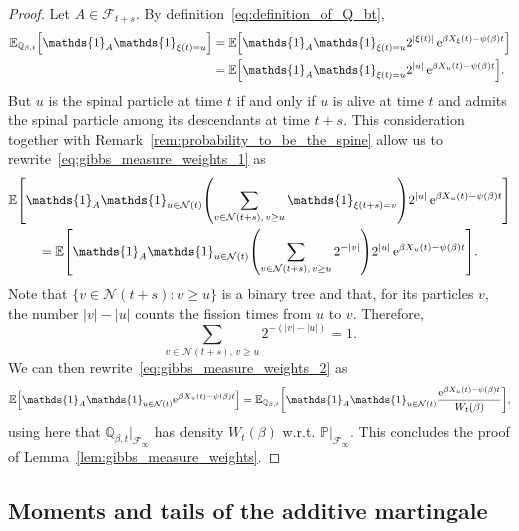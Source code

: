 \documentclass[AHL,Unicode,longabstracts,published]{cedram}
\newcommand{\e}{\mathrm{e}}
\newcommand{\E}{\mathbb{E}}
\renewcommand{\P}{\mathbb{P}}
\newcommand{\Q}{\mathbb{Q}}
\newcommand\1{\mathds{1}}
\newcommand{\cF}{\mathcal{F}}
\newcommand{\cN}{\mathcal{N}}
\let\originalleft\left
\let\originalright\right
\renewcommand{\left}{\mathopen{}\mathclose\bgroup\originalleft}
\renewcommand{\right}{\aftergroup\egroup\originalright}
\begin{document}
\begin{proof}
Let $A \in \cF_{t+s}$. By definition~\eqref{eq:definition_of_Q_bt},
\begin{equation}\label{eq:gibbs_measure_weights_1}
\begin{aligned}
\E_{\Q_{\beta, t}} \left[\1_A \1_{\xi(t) = u} \right] & = \E \left[\1_A \1_{\xi(t) = u} 2^{|\xi(t)|}\, \e^{\beta X_\xi(t) - \psi(\beta) t} \right] \\
& = \E \left[\1_A \1_{\xi(t) = u} 2^{|u|}\, \e^{\beta X_u(t) - \psi(\beta) t} \right]. 
\end{aligned}
\end{equation}
But $u$ is the spinal particle at time $t$ if and only if $u$ is alive at time $t$ and admits the spinal particle among its descendants at time $t + s$. This consideration together with Remark~\ref{rem:probability_to_be_the_spine} allow us to rewrite~\eqref{eq:gibbs_measure_weights_1} as
\begin{multline}\label{eq:gibbs_measure_weights_2}
\E \left[\1_A \1_{u \in \cN(t)} \left(\sum_{v \in \cN(t+s),\, v \geq u} \1_{\xi(t+s) = v}\right) 2^{|u|}\, \e^{\beta X_u(t) - \psi(\beta) t} \right] \\
 = \E \left[\1_A \1_{u \in \cN(t)} \left(\sum_{v \in \cN(t+s),\, v \geq u} 2^{-|v|} \right) 2^{|u|}\, \e^{\beta X_u(t) - \psi(\beta) t} \right].
\end{multline}
Note that $\{v \in \cN(t+s) : v \geq u\}$ is a binary tree and that, for its particles $v$, the number $|v| - |u|$ counts the fission times from $u$ to $v$. Therefore,
\begin{equation*}
\sum_{v \in \cN(t+s),\, v \geq u} 2^{-(|v| - |u|)} = 1.
\end{equation*}
We can then rewrite~\eqref{eq:gibbs_measure_weights_2} as
\begin{equation*}
\E \left[\1_A \1_{u \in \cN(t)} \e^{\beta X_u(t) - \psi(\beta) t} \right] = \E_{\Q_{\beta, t}} \left[\1_A \1_{u \in \cN(t)} \frac{\e^{\beta X_u(t) - \psi(\beta) t}}{W_t(\beta)} \right],
\end{equation*}
using here that $\Q_{\beta,t}|_{\cF_\infty}$ has density $W_t(\beta)$ w.r.t. $\P|_{\cF_\infty}$. This concludes the proof of Lemma~\ref{lem:gibbs_measure_weights}.
\end{proof}

\subsection{Moments and tails of the additive martingale}
\end{document}
